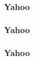 
\begin{frame}
    \frametitle{Yahoo}
  

\end{frame}

\begin{frame}
    \frametitle{Yahoo}
  

\end{frame}

\begin{frame}
    \frametitle{Yahoo}
  

\end{frame}